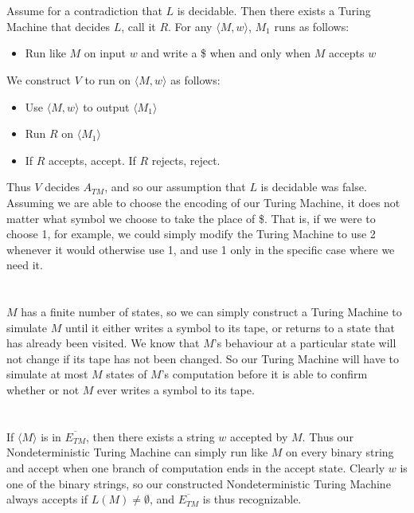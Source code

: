 \documentclass{article}
\begin{document}
\section{} %
Assume for a contradiction that $L$ is decidable. Then there exists a Turing
Machine that decides $L$, call it $R$.
\newline
\newline
For any $\langle M,w\rangle$, $M_1$ runs as follows:
\begin{itemize}
	\item Run like $M$ on input $w$ and write a \$ when and only when $M$
		accepts $w$
\end{itemize}
We construct $V$ to run on $\langle M,w\rangle$ as follows:
\begin{itemize}
	\item Use $\langle M,w\rangle$ to output $\langle M_1\rangle$
	\item Run $R$ on $\langle M_1\rangle$
	\item If $R$ accepts, accept. If $R$ rejects, reject.
\end{itemize}
Thus $V$ decides $A_{TM}$, and so our assumption that $L$ is decidable was
false.
\newline
\newline
Assuming we are able to choose the encoding of our Turing Machine, it does not
matter what symbol we choose to take the place of \$. That is, if we were to
choose 1, for example, we could simply modify the Turing Machine to use 2
whenever it would otherwise use 1, and use 1 only in the specific case where we
need it.

\section{} %
$M$ has a finite number of states, so we can simply construct a Turing Machine
to simulate $M$ until it either writes a symbol to its tape, or returns to a
state that has already been visited. We know that $M$'s behaviour at a
particular state will not change if its tape has not been changed. So our
Turing Machine will have to simulate at most $M$ states of $M$'s computation
before it is able to confirm whether or not $M$ ever writes a symbol to its
tape.

\section{} %
If $\langle M\rangle$ is in $\overline{E_{TM}}$, then there exists a string $w$
accepted by $M$. Thus our Nondeterministic Turing Machine can simply run like
$M$ on every binary string and accept when one branch of computation ends in
the accept state. Clearly $w$ is one of the binary strings, so our constructed
Nondeterministic Turing Machine always accepts if $L(M)\neq\emptyset$, and
$\overline{E_{TM}}$ is thus recognizable.
\end{document}
